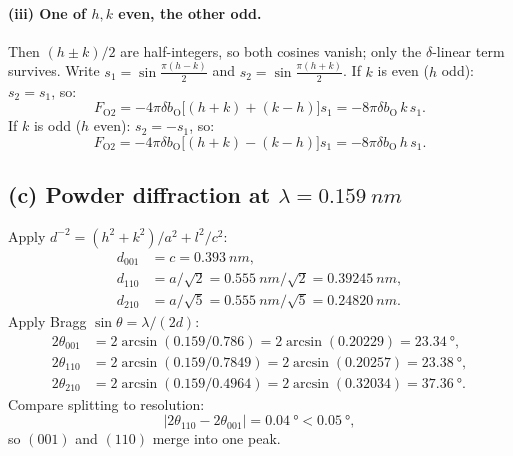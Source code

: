 \documentclass[11pt]{article}
\begin{document}
\paragraph{(iii) One of $h,k$ even, the other odd.} Then $(h\pm k)/2$ are half-integers, so both cosines vanish; only the $\delta$-linear term survives. Write $s_1=\sin\tfrac{\pi(h-k)}{2}$ and $s_2=\sin\tfrac{\pi(h+k)}{2}$. If $k$ is even ($h$ odd): $s_2=s_1$, so:
\begin{equation}
F_{\mathrm{O2}}=-4\pi\delta b_{\mathrm{O}}\bigl[(h+k)+(k-h)\bigr]s_1=-8\pi\delta b_{\mathrm{O}}\,k\,s_1.
\label{eq:Fo2-keven}
\end{equation}
If $k$ is odd ($h$ even): $s_2=-s_1$, so:
\begin{equation}
F_{\mathrm{O2}}=-4\pi\delta b_{\mathrm{O}}\bigl[(h+k)-(k-h)\bigr]s_1=-8\pi\delta b_{\mathrm{O}}\,h\,s_1.
\label{eq:Fo2-kodd}
\end{equation}

\subsection*{(c) Powder diffraction at $\lambda=\SI{0.159}{nm}$}

Apply $d^{-2}=(h^2+k^2)/a^2+l^2/c^2$:
\begin{align}
d_{001}&=c=\SI{0.393}{nm},\\
d_{110}&=a/\sqrt{2}=\SI{0.555}{nm}/\sqrt2=\SI{0.39245}{nm},\\
d_{210}&=a/\sqrt{5}=\SI{0.555}{nm}/\sqrt5=\SI{0.24820}{nm}.
\end{align}
Apply Bragg $\sin\theta=\lambda/(2d)$:
\begin{align}
2\theta_{001}&=2\arcsin(0.159/0.786)=2\arcsin(0.20229)=\SI{23.34}{\degree},\\
2\theta_{110}&=2\arcsin(0.159/0.7849)=2\arcsin(0.20257)=\SI{23.38}{\degree},\\
2\theta_{210}&=2\arcsin(0.159/0.4964)=2\arcsin(0.32034)=\SI{37.36}{\degree}.
\end{align}
Compare splitting to resolution:
\begin{equation}
|2\theta_{110}-2\theta_{001}|=\SI{0.04}{\degree}<\SI{0.05}{\degree},
\end{equation}
so $(001)$ and $(110)$ merge into one peak.
\end{document}
